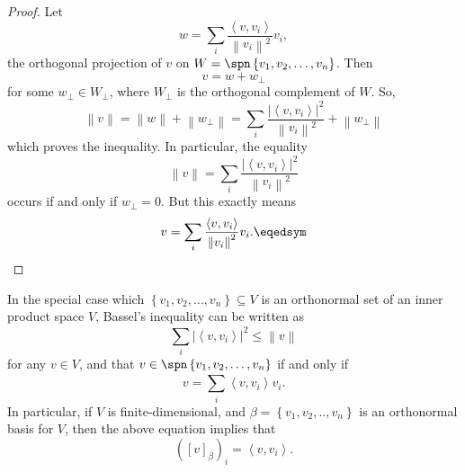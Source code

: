 \documentclass[linearalgebra]{subfiles}
\begin{document}
    \begin{proof}
        Let
        \begin{equation*}
            w = \sum^{}_{i} \frac{\left\langle v, v_i\right\rangle }{\left\lVert v_i\right\rVert ^2}v_i,
        \end{equation*}
        the orthogonal projection of $v$ on $W = \spn\left\lbrace v_1,v_2,\ldots,v_n \right\rbrace$. Then
        \begin{equation*}
            v = w + w_\perp
        \end{equation*}
        for some $w_\perp\in W_\perp$, where $W_\perp$ is the orthogonal complement of $W$. So,
        \begin{equation*}
            \left\lVert v\right\rVert = \left\lVert w\right\rVert + \left\lVert w_\perp\right\rVert = \sum^{}_{i} \frac{\left| \left\langle v, v_i\right\rangle  \right| ^2}{\left\lVert v_i\right\rVert ^2} + \left\lVert w_\perp\right\rVert 
        \end{equation*}
        which proves the inequality. In particular, the equality
        \begin{equation*}
            \left\lVert v\right\rVert = \sum^{}_{i} \frac{\left| \left\langle v, v_i\right\rangle  \right| ^2}{\left\lVert v_i\right\rVert ^2}
        \end{equation*}
        occurs if and only if $w_\perp = 0$. But this exactly means
        \begin{equation*}
            v = \sum^{}_{i} \frac{\left\langle v, v_i\right\rangle }{\left\lVert v_i\right\rVert ^2}v_i. \eqedsym
        \end{equation*}
    \end{proof}

    \begin{remark}
        In the special case which $\left\lbrace v_1,v_2,\ldots,v_n \right\rbrace\subseteq V$ is an orthonormal set of an inner product space $V$, Bassel's inequality can be written as
        \begin{equation*}
            \sum^{}_{i} \left| \left\langle v, v_i\right\rangle  \right| ^2\leq \left\lVert v\right\rVert 
        \end{equation*}
        for any $v\in V$, and that $v\in\spn\left\lbrace v_1,v_2,\ldots,v_n \right\rbrace $ if and only if
        \begin{equation*}
            v = \sum^{}_{i} \left\langle v, v_i\right\rangle v_i.
        \end{equation*}
        In particular, if $V$ is finite-dimensional, and $\beta = \left\lbrace v_1,v_2,..,v_n \right\rbrace$ is an orthonormal basis for $V$, then the above equation implies that
        \begin{equation*}
            \left( \left[ v \right] _\beta \right) _i = \left\langle v, v_i\right\rangle .
        \end{equation*}
    \end{remark}
\end{document}
